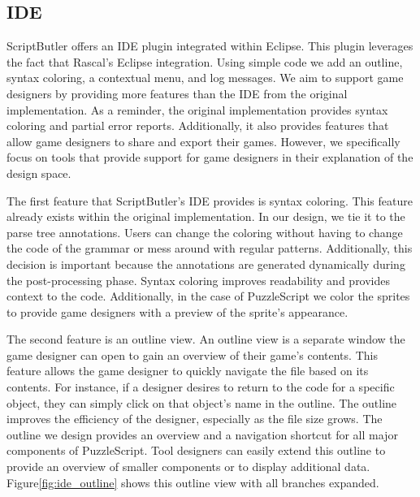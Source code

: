 \subsection{IDE}
\label{sec:ide}
ScriptButler offers an IDE plugin integrated within Eclipse. This plugin leverages the fact that Rascal's Eclipse integration. Using simple code we add an outline, syntax coloring, a contextual menu, and log messages. We aim to support game designers by providing more features than the IDE from the original implementation. As a reminder, the original implementation provides syntax coloring and partial error reports. Additionally, it also provides features that allow game designers to share and export their games. However, we specifically focus on tools that provide support for game designers in their explanation of the design space.

The first feature that ScriptButler's IDE provides is syntax coloring. This feature already exists within the original implementation. In our design, we tie it to the parse tree annotations\dd. Users can change the coloring without having to change the code of the grammar or mess around with regular patterns. Additionally, this decision is important because the annotations are generated dynamically during the post-processing phase. Syntax coloring improves readability and provides context to the code\cite{DBLP:conf/ppig/Sarkar15a}. Additionally, in the case of PuzzleScript we color the sprites to provide game designers with a preview of the sprite's appearance.


The second feature is an outline view\dd. An outline view is a separate window the game designer can open to gain an overview of their game's contents. This feature allows the game designer to quickly navigate the file based on its contents. For instance, if a designer desires to return to the code for a specific object, they can simply click on that object's name in the outline. The outline improves the efficiency of the designer, especially as the file size grows. The outline we design provides an overview and a navigation shortcut for all major components of PuzzleScript. Tool designers can easily extend this outline to provide an overview of smaller components or to display additional data. Figure\ref{fig:ide_outline} shows this outline view with all branches expanded.

